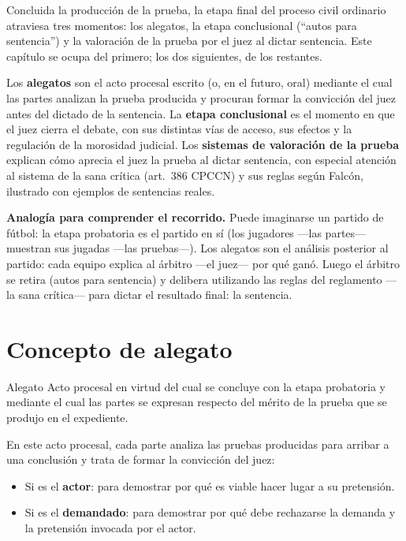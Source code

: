 \documentclass[12pt,oneside]{book}
\begin{document}
Concluida la producción de la prueba, la etapa final del proceso civil ordinario atraviesa tres momentos: los alegatos, la etapa conclusional (``autos para sentencia'') y la valoración de la prueba por el juez al dictar sentencia. Este capítulo se ocupa del primero; los dos siguientes, de los restantes.

Los \textbf{alegatos} son el acto procesal escrito (o, en el futuro, oral) mediante el cual las partes analizan la prueba producida y procuran formar la convicción del juez antes del dictado de la sentencia. La \textbf{etapa conclusional} es el momento en que el juez cierra el debate, con sus distintas vías de acceso, sus efectos y la regulación de la morosidad judicial. Los \textbf{sistemas de valoración de la prueba} explican cómo aprecia el juez la prueba al dictar sentencia, con especial atención al sistema de la sana crítica (art.~386 CPCCN) y sus reglas según Falcón, ilustrado con ejemplos de sentencias reales.

\begin{note}
\textbf{Analogía para comprender el recorrido.} Puede imaginarse un partido de fútbol: la etapa probatoria es el partido en sí (los jugadores ---las partes--- muestran sus jugadas ---las pruebas---). Los alegatos son el análisis posterior al partido: cada equipo explica al árbitro ---el juez--- por qué ganó. Luego el árbitro se retira (autos para sentencia) y delibera utilizando las reglas del reglamento ---la sana crítica--- para dictar el resultado final: la sentencia.
\end{note}

\section{Concepto de alegato}

\begin{definition}{Alegato}
Acto procesal en virtud del cual se concluye con la etapa probatoria y mediante el cual las partes se expresan respecto del mérito de la prueba que se produjo en el expediente.
\end{definition}

En este acto procesal, cada parte analiza las pruebas producidas para arribar a una conclusión y trata de formar la convicción del juez:

\begin{itemize}
    \item Si es el \textbf{actor}: para demostrar por qué es viable hacer lugar a su pretensión.
    \item Si es el \textbf{demandado}: para demostrar por qué debe rechazarse la demanda y la pretensión invocada por el actor.
\end{itemize}
\end{document}
